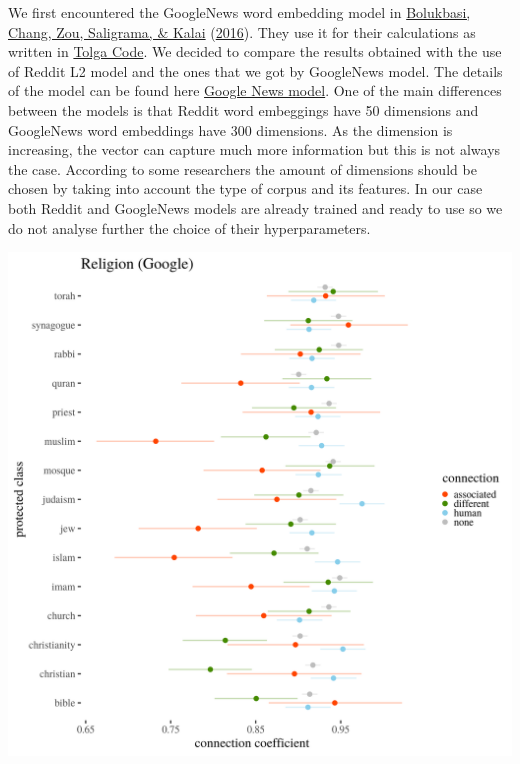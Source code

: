\documentclass[
  12pt,
]{book}
\begin{document}
We first encountered the GoogleNews word embedding model in \protect\hyperlink{ref-Bolukbasi2016Man}{Bolukbasi, Chang, Zou, Saligrama, \& Kalai} (\protect\hyperlink{ref-Bolukbasi2016Man}{2016}). They use it for their calculations as written in \href{https://github.com/tolga-b/debiaswe}{Tolga Code}. We decided to compare the results obtained with the use of Reddit L2 model and the ones that we got by GoogleNews model. The details of the model can be found here \href{https://code.google.com/archive/p/word2vec/}{Google News model}. One of the main differences between the models is that Reddit word embeggings have 50 dimensions and GoogleNews word embeddings have 300 dimensions. As the dimension is increasing, the vector can capture much more information but this is not always the case. According to some researchers the amount of dimensions should be chosen by taking into account the type of corpus and its features. In our case both Reddit and GoogleNews models are already trained and ready to use so we do not analyse further the choice of their hyperparameters.

\includegraphics[width=14cm]{../images/visReligionGoogle.png}
\end{document}
